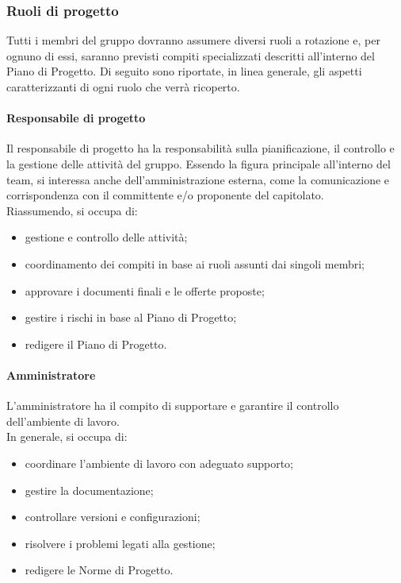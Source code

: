 	\subsubsection{Ruoli di progetto}
	Tutti i membri del gruppo dovranno assumere diversi ruoli a rotazione e, per ognuno di essi, saranno previsti compiti specializzati descritti all'interno del Piano di Progetto. Di seguito sono riportate, in linea generale, gli aspetti caratterizzanti di ogni ruolo che verrà ricoperto.
	
		\paragraph{Responsabile di progetto}
		Il responsabile di progetto ha la responsabilità sulla pianificazione, il controllo e la gestione delle attività del gruppo. Essendo la figura principale all'interno del team, si interessa anche dell'amministrazione esterna, come la comunicazione e corrispondenza con il committente e/o proponente del capitolato.\\
		Riassumendo, si occupa di:
		\begin{itemize}
			\item gestione e controllo delle attività;
			\item coordinamento dei compiti in base ai ruoli assunti dai singoli membri;
			\item approvare i documenti finali e le offerte proposte;
			\item gestire i rischi in base al Piano di Progetto;
			\item redigere il Piano di Progetto.
		\end{itemize}
		
		\paragraph{Amministratore}
		L'amministratore ha il compito di supportare e garantire il controllo dell'ambiente di lavoro. \\
		In generale, si occupa di:	
		\begin{itemize}
			\item coordinare l'ambiente di lavoro con adeguato supporto;
			\item gestire la documentazione;
			\item controllare versioni e configurazioni;
			\item risolvere i problemi legati alla gestione;
			\item redigere le Norme di Progetto.
		\end{itemize}
	
